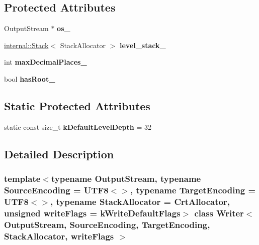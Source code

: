 \subsection*{Protected Attributes}
\begin{DoxyCompactItemize}
\item 
\mbox{\label{class_writer_a3a3f60140f78dd67b5274978fd3a33ff}} 
Output\+Stream $\ast$ {\bfseries os\+\_\+}
\item 
\mbox{\label{class_writer_a9e6c13c06fc721dfd8486f17b9ff29de}} 
\hyperlink{classinternal_1_1_stack}{internal\+::\+Stack}$<$ Stack\+Allocator $>$ {\bfseries level\+\_\+stack\+\_\+}
\item 
\mbox{\label{class_writer_a3d4ef664c3cdf34a286b13d27adcdd4d}} 
int {\bfseries max\+Decimal\+Places\+\_\+}
\item 
\mbox{\label{class_writer_affc6b9e0332b50bee0d33f8b1841c9a6}} 
bool {\bfseries has\+Root\+\_\+}
\end{DoxyCompactItemize}
\subsection*{Static Protected Attributes}
\begin{DoxyCompactItemize}
\item 
\mbox{\label{class_writer_a9cb4caeb9d8971f305edff1d70e67acb}} 
static const size\+\_\+t {\bfseries k\+Default\+Level\+Depth} = 32
\end{DoxyCompactItemize}


\subsection{Detailed Description}
\subsubsection*{template$<$typename Output\+Stream, typename Source\+Encoding = U\+T\+F8$<$$>$, typename Target\+Encoding = U\+T\+F8$<$$>$, typename Stack\+Allocator = Crt\+Allocator, unsigned write\+Flags = k\+Write\+Default\+Flags$>$\newline
class Writer$<$ Output\+Stream, Source\+Encoding, Target\+Encoding, Stack\+Allocator, write\+Flags $>$}

